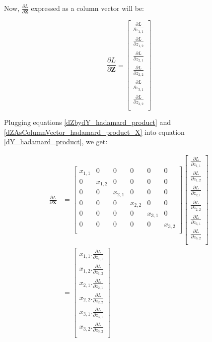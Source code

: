 \documentclass{article}
\newcommand{\matr}[1]{\mathbf{#1}} %
\begin{document}
Now, $\frac{\partial L}{\partial \matr{Z}}$ expressed as a column vector will be:

\begin{equation} \label{dZAsColumnVector_hadamard_product_X}
\frac{\partial L}{\partial \matr{Z}} =
\begin{bmatrix}
\frac{\partial L}{\partial z_{1,1}} \\[0.7em]
\frac{\partial L}{\partial z_{1,2}} \\[0.7em]
\frac{\partial L}{\partial z_{2,1}} \\[0.7em]
\frac{\partial L}{\partial z_{2,2}} \\[0.7em]
\frac{\partial L}{\partial z_{3,1}} \\[0.7em]
\frac{\partial L}{\partial z_{3,2}} \\[0.7em]
\end{bmatrix}
\end{equation}

Plugging equations \ref{dZbydY_hadamard_product} and \ref{dZAsColumnVector_hadamard_product_X} into equation \ref{dY_hadamard_product}, we get:

\begin{align}
\frac{\partial L}{\partial \matr{X}} &=
\begin{bmatrix}
x_{1,1} & 0 & 0 & 0 & 0 & 0 \\[0.5em]
0 & x_{1,2} & 0 & 0 & 0 & 0 \\[0.5em]
0 & 0 & x_{2,1} & 0 & 0 & 0 \\[0.5em]
0 & 0 & 0 & x_{2,2} & 0 & 0 \\[0.5em]
0 & 0 & 0 & 0 & x_{3,1} & 0 \\[0.5em]
0 & 0 & 0 & 0 & 0 & x_{3,2} \\[0.5em]
\end{bmatrix}
\begin{bmatrix}
\frac{\partial L}{\partial z_{1,1}} \\[0.7em]
\frac{\partial L}{\partial z_{1,2}} \\[0.7em]
\frac{\partial L}{\partial z_{2,1}} \\[0.7em]
\frac{\partial L}{\partial z_{2,2}} \\[0.7em]
\frac{\partial L}{\partial z_{3,1}} \\[0.7em]
\frac{\partial L}{\partial z_{3,2}} \\[0.7em]
\end{bmatrix}
\nonumber \\
&=
\begin{bmatrix}
x_{1,1}.\frac{\partial L}{\partial z_{1,1}} \\[0.7em]
x_{1,2}.\frac{\partial L}{\partial z_{1,2}} \\[0.7em]
x_{2,1}.\frac{\partial L}{\partial z_{2,1}} \\[0.7em]
x_{2,2}.\frac{\partial L}{\partial z_{2,2}} \\[0.7em]
x_{3,1}.\frac{\partial L}{\partial z_{3,1}} \\[0.7em]
x_{3,2}.\frac{\partial L}{\partial z_{3,2}} \\[0.7em]
\end{bmatrix} \label{dYAsColumnVector_hadamard_product}
\end{align}
\end{document}
